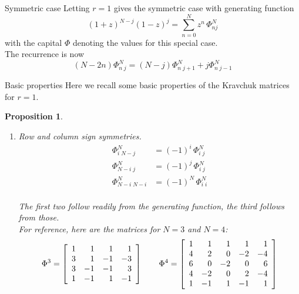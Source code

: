 \documentclass[12pt,reqno]{amsart}
\newtheorem{proposition}[theorem]{Proposition}  %
\newcommand{\FF}[2]{\Phi^{#1}_{#2}}
\begin{document}
\begin{section}{Symmetric case}
Letting $r=1$ gives the symmetric case with generating function
\begin{equation}\label{eq:symmgf}
(1+z)^{N-j}(1-z)^j=\sum_{n=0}^N z^n\,\Phi_{nj}^{N}
\end{equation}
with the capital $\Phi$ denoting the values for this special case.\\

The recurrence is now
\begin{equation}\label{eq:rrec}
(N-2n)\FF N{n\;j}=(N-j)\FF N{n\;j+1}+j \FF N{n\;j-1} 
\end{equation}

\begin{subsection}{Basic properties}
Here we recall some basic properties of the Kravchuk matrices for $r=1$.\\

\begin{proposition}\label{prop:props}\hfill \\
\rm
\begin{enumerate}     
\item Row and column sign symmetries.
\begin{align*}
\FF{N}{i\;N-j}&=(-1)^i\,\FF{N}{i\;j}\\
\FF{N}{N-i\;j}&=(-1)^j\,\FF{N}{i\;j}\\
\FF{N}{N-i\;N-i}&=(-1)^N\,\FF{N}{i\;i}\\
\end{align*}

The first two follow readily from the generating function, the third follows from those.\\

For reference, here are the matrices for $N=3$ and $N=4$:
$$
\Phi^{3}=
       \left[\begin{array}{rrrr}
                      1 &  1 &  1  &  1 \cr
                      3 &  1 & -1  & -3 \cr
                      3 & -1 & -1  &  3 \cr
                      1 & -1 &  1  & -1 \cr 
             \end{array}\right]
\qquad
\Phi^{4}=
       \left[\begin{array}{rrrrr} 1 &  1 &  1  &  1  &  1 \cr
                      4 &  2 &  0  & -2  & -4 \cr
                      6 &  0 & -2  &  0  &  6 \cr
                      4 & -2 &  0  &  2  & -4 \cr
                      1 & -1 &  1  & -1  &  1 \cr \end{array}\right]
$$


\end{enumerate}
\end{proposition}
\end{subsection}
\end{section}
\end{document}

